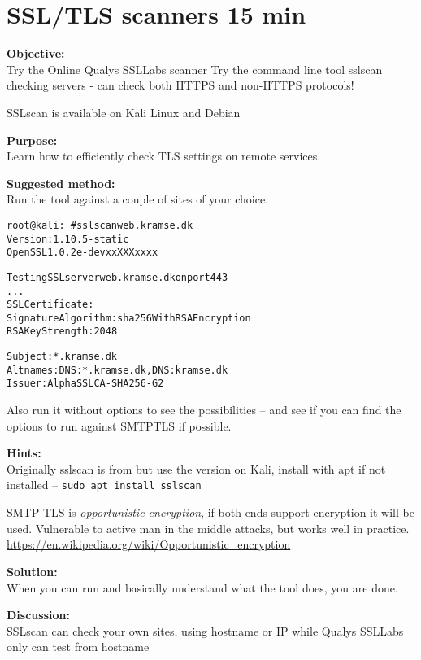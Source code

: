 \documentclass[a4paper,11pt,notitlepage]{report}
\begin{document}
\chapter{SSL/TLS scanners 15 min}
\label{ex:sslscan}

{\bf Objective:}\\
Try the Online Qualys SSLLabs scanner 
Try the command line tool sslscan checking servers - can check both HTTPS and non-HTTPS protocols!

SSLscan is available on Kali Linux and Debian

{\bf Purpose:}\\
Learn how to efficiently check TLS settings on remote services.

{\bf Suggested method:}\\
Run the tool against a couple of sites of your choice.

\begin{alltt}\small
root@kali:~# sslscan web.kramse.dk
Version: 1.10.5-static
OpenSSL 1.0.2e-dev xx XXX xxxx

Testing SSL server web.kramse.dk on port 443
...
  SSL Certificate:
Signature Algorithm: sha256WithRSAEncryption
RSA Key Strength:    2048

Subject:  *.kramse.dk
Altnames: DNS:*.kramse.dk, DNS:kramse.dk
Issuer:   AlphaSSL CA - SHA256 - G2
\end{alltt}

Also run it without options to see the possibilities -- and see if you can find the options to run against SMTPTLS if possible.

{\bf Hints:}\\
Originally sslscan is from  but use the version on Kali, install with apt if not installed -- \verb+sudo apt install sslscan+

SMTP TLS is \emph{opportunistic encryption}, if both ends support encryption it will be used. Vulnerable to active man in the middle attacks, but works well in practice.\\
\url{https://en.wikipedia.org/wiki/Opportunistic_encryption}

{\bf Solution:}\\
When you can run and basically understand what the tool does, you are done.

{\bf Discussion:}\\
SSLscan can check your own sites, using hostname or IP while Qualys SSLLabs only can test from hostname
\end{document}

